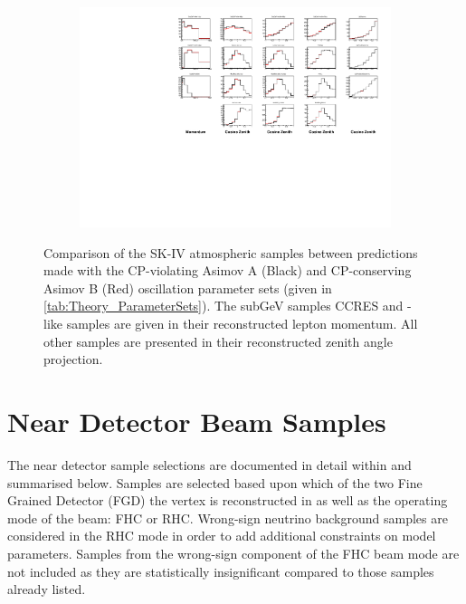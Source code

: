\begin{figure}
  \centering
  \begin{subfigure}[t]{\textwidth}
    \includegraphics[width=\textwidth, trim={0mm 0mm 0mm 0mm}, clip,page=1]{Figures/Selections/HistogramComparison.pdf}
  \end{subfigure}
  \caption{Comparison of the SK-IV atmospheric samples between predictions made with the CP-violating Asimov A (Black) and CP-conserving Asimov B (Red) oscillation parameter sets (given in \autoref{tab:Theory_ParameterSets}). The subGeV samples CCRES and -like samples are given in their reconstructed lepton momentum. All other samples are presented in their reconstructed zenith angle projection.}
  \label{fig:SelsAndSysts_AllSampleComparison}
\end{figure}

\clearpage
\section{Near Detector Beam Samples}
\label{sec:SelsAndSysts_Sels_ND}

The near detector sample selections are documented in detail within \cite{t2k_tn_395} and summarised below. Samples are selected based upon which of the two Fine Grained Detector (FGD) the vertex is reconstructed in as well as the operating mode of the beam: FHC or RHC. Wrong-sign neutrino background samples are considered in the RHC mode in order to add additional constraints on model parameters. Samples from the wrong-sign component of the FHC beam mode are not included as they are statistically insignificant compared to those samples already listed.

